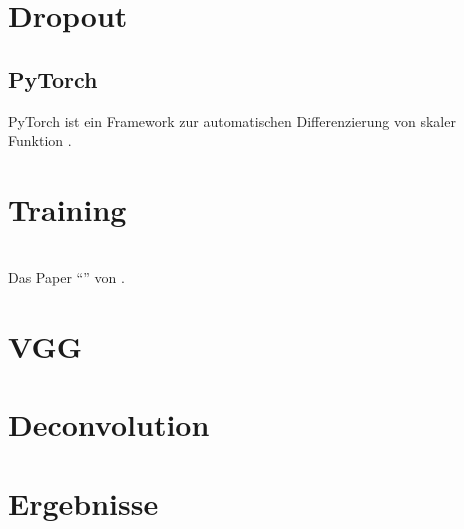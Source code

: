 \section{Dropout}

\subsection{PyTorch}
PyTorch ist ein Framework zur automatischen Differenzierung von skaler Funktion \autocite{PaszkeAutomaticdifferentiationPyTorch2017}.

\section{Training}


\section{\textcite{XuPageSegmentationHistorical2017}}
Das Paper ``'' von \citeauthor*{XuPageSegmentationHistorical2017}.

\section{VGG}
\section{Deconvolution}
\section{Ergebnisse}